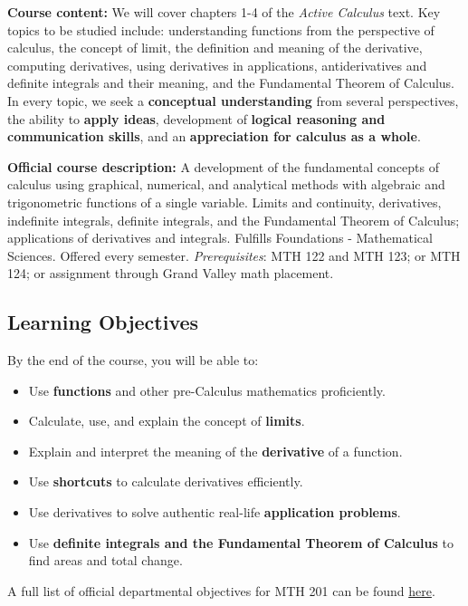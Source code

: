 \documentclass[]{article}
\providecommand{\tightlist}{%
  \setlength{\itemsep}{0pt}\setlength{\parskip}{0pt}}
\begin{document}
\textbf{Course content:} We will cover chapters 1-4 of the \emph{Active
Calculus} text. Key topics to be studied include: understanding
functions from the perspective of calculus, the concept of limit, the
definition and meaning of the derivative, computing derivatives, using
derivatives in applications, antiderivatives and definite integrals and
their meaning, and the Fundamental Theorem of Calculus. In every topic,
we seek a \textbf{conceptual understanding} from several perspectives,
the ability to \textbf{apply ideas}, development of \textbf{logical
reasoning and communication skills}, and an \textbf{appreciation for
calculus as a whole}.

\textbf{Official course description:} A development of the fundamental
concepts of calculus using graphical, numerical, and analytical methods
with algebraic and trigonometric functions of a single variable. Limits
and continuity, derivatives, indefinite integrals, definite integrals,
and the Fundamental Theorem of Calculus; applications of derivatives and
integrals. Fulfills Foundations - Mathematical Sciences. Offered every
semester. \emph{Prerequisites}: MTH 122 and MTH 123; or MTH 124; or
assignment through Grand Valley math placement.

\hypertarget{learning-objectives}{%
\subsection{Learning Objectives}\label{learning-objectives}}

By the end of the course, you will be able to:

\begin{itemize}
\tightlist
\item
  Use \textbf{functions} and other pre-Calculus mathematics
  proficiently.
\item
  Calculate, use, and explain the concept of \textbf{limits}.
\item
  Explain and interpret the meaning of the \textbf{derivative} of a
  function.
\item
  Use \textbf{shortcuts} to calculate derivatives efficiently.
\item
  Use derivatives to solve authentic real-life \textbf{application
  problems}.
\item
  Use \textbf{definite integrals and the Fundamental Theorem of
  Calculus} to find areas and total change.
\end{itemize}

A full list of official departmental objectives for MTH 201 can be found
\href{https://www.gvsu.edu/cms4/asset/9A420BCF-BA9E-0845-91754145EA82C51F/sor_descriptions_objectives__topics_for_faculty_updated_12-11-19.pdf}{here}.
\end{document}
